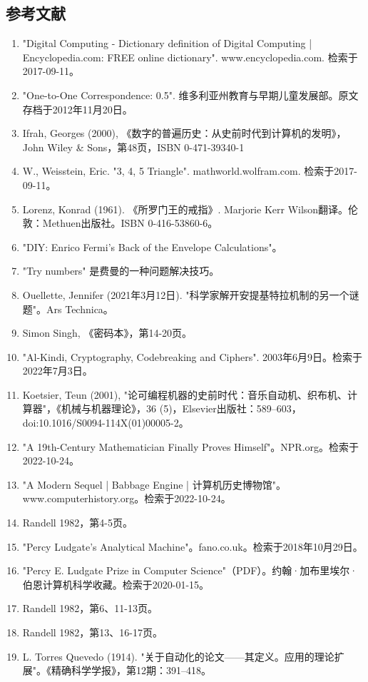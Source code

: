 \subsection{参考文献}
\begin{enumerate}
\item "Digital Computing - Dictionary definition of Digital Computing | Encyclopedia.com: FREE online dictionary". www.encyclopedia.com. 检索于2017-09-11。
\item "One-to-One Correspondence: 0.5". 维多利亚州教育与早期儿童发展部。原文存档于2012年11月20日。
\item Ifrah, Georges (2000), 《数字的普遍历史：从史前时代到计算机的发明》，John Wiley & Sons，第48页，ISBN 0-471-39340-1
\item W., Weisstein, Eric. "3, 4, 5 Triangle". mathworld.wolfram.com. 检索于2017-09-11。
\item Lorenz, Konrad (1961). 《所罗门王的戒指》. Marjorie Kerr Wilson翻译。伦敦：Methuen出版社。ISBN 0-416-53860-6。
\item "DIY: Enrico Fermi's Back of the Envelope Calculations"。
\item "Try numbers" 是费曼的一种问题解决技巧。
\item Ouellette, Jennifer (2021年3月12日). "科学家解开安提基特拉机制的另一个谜题"。Ars Technica。
\item Simon Singh, 《密码本》，第14-20页。
\item "Al-Kindi, Cryptography, Codebreaking and Ciphers". 2003年6月9日。检索于2022年7月3日。
\item Koetsier, Teun (2001), "论可编程机器的史前时代：音乐自动机、织布机、计算器"，《机械与机器理论》，36 (5)，Elsevier出版社：589–603，doi:10.1016/S0094-114X(01)00005-2。
\item "A 19th-Century Mathematician Finally Proves Himself"。NPR.org。检索于2022-10-24。
\item "A Modern Sequel | Babbage Engine | 计算机历史博物馆"。www.computerhistory.org。检索于2022-10-24。
\item Randell 1982，第4-5页。
\item "Percy Ludgate's Analytical Machine"。fano.co.uk。检索于2018年10月29日。
\item "Percy E. Ludgate Prize in Computer Science"（PDF）。约翰·加布里埃尔·伯恩计算机科学收藏。检索于2020-01-15。
\item Randell 1982，第6、11-13页。
\item Randell 1982，第13、16-17页。
\item L. Torres Quevedo (1914). "关于自动化的论文——其定义。应用的理论扩展"。《精确科学学报》，第12期：391–418。

\end{enumerate}
